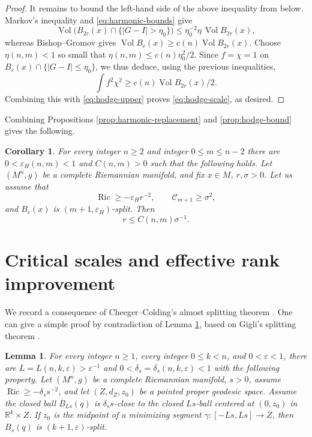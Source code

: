 \documentclass[11pt]{amsart}
\newtheorem{lemma}[theorem]{Lemma}
\newtheorem{corollary}[theorem]{Corollary}
\theoremstyle{definition}
\theoremstyle{remark}
\DeclareMathOperator{\Ric}{Ric}
\DeclareMathOperator{\Vol}{Vol}
\newcommand{\R}{\mathbb R}
\newcommand{\eps}{\varepsilon}
\begin{document}
\begin{proof}
It remains to bound the left-hand side of the above inequality from below.  Markov's
inequality and \eqref{eq:harmonic-bounds} give
\[
 \Vol\bigl(B_{2r}(x)\cap\{|G-I|>\eta_0\}\bigr)
 \leq \eta_0^{-2}\eta\,\Vol B_{2r}(x),
\]
whereas Bishop--Gromov gives
$\Vol B_r(x)\geq c(n)\Vol B_{2r}(x)$.  Choose $\eta(n,m)<1$ so small that 
$\eta(n,m)\leq c(n)\eta_0^2/2$.  Since $f=\chi=1$ on
$B_r(x)\cap\{|G-I|\leq\eta_0\}$, we thus deduce, using the previous inequalities,
\[
        \int f^2\chi^2\geq c(n)\Vol B_{2r}(x)/2.
\]
Combining this with \eqref{eq:hodge-upper} proves
\eqref{eq:hodge-scale}, as desired.
\end{proof}

Combining Propositions \ref{prop:harmonic-replacement} and
\ref{prop:hodge-bound} gives the following.

\begin{corollary}
\label{cor:bounded-splitting}
For every integer $n\geq2$ and integer $0\leq m\leq n-2$ there are
$0<\eps_H(n,m)<1$ and $C(n,m)>0$ such that the following holds. Let $(M^n,g)$ be a complete Riemannian manifold, and fix $x\in M$, $r,\sigma>0$. Let us assume that
\[
         \Ric\geq - \eps_H r^{-2},\qquad \mathcal{C}_{m+1}\geq\sigma^2,
\]
and $B_r(x)$ is $(m+1,\eps_H)$-split. Then
\[
                           r\leq C(n,m)\sigma^{-1}.
\]
\end{corollary}

\section{Critical scales and effective rank improvement}

We record a consequence of Cheeger--Colding's almost splitting theorem \cite{CheegerColdingWarped, CheegerColdingI}. One can give a simple proof by contradiction of Lemma \ref{lem:finite-segment}, based on Gigli's splitting theorem \cite{GigliSplitting}.

\begin{lemma}\label{lem:finite-segment}
For every integer $n\geq 1$, every integer $0\leq k<n$, and $0<\eps<1$, there are
$L=L(n,k,\eps)>\eps^{-1}$ and
$0<\delta_s=\delta_s(n,k,\eps)<1$ with the following property.
Let $(M^n,g)$ be a complete Riemannian manifold, $s>0$, assume $\Ric\geq -\delta_ss^{-2}$, and let $(Z,d_Z,z_0)$ be a pointed proper geodesic space. Assume the closed ball $\overline B_{Ls}(q)$ is
$\delta_s s$-close to the closed $Ls$-ball centered at $(0,z_0)$ in
$\R^k\times Z$.  If $z_0$ is the midpoint of a minimizing 
segment $\gamma:[-Ls,Ls]\to Z$, then
$B_s(q)$ is $(k+1,\eps)$-split.
\end{lemma}
\end{document}
